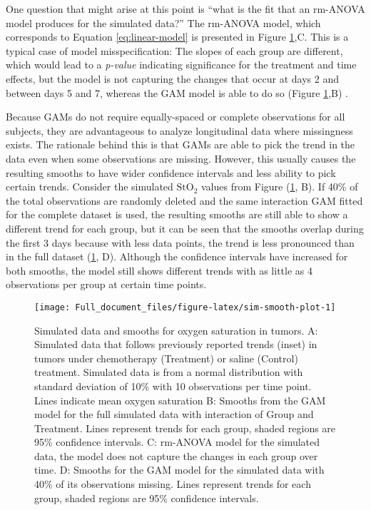 \documentclass[
]{article}
\begin{document}
One question that might arise at this point is ``what is the fit that an rm-ANOVA model produces for the simulated data?'' The rm-ANOVA model, which corresponds to Equation \eqref{eq:linear-model} is presented in Figure \ref{fig:sim-smooth-plot},C. This is a typical case of model misspecification: The slopes of each group are different, which would lead to a \emph{p-value} indicating significance for the treatment and time effects, but the model is not capturing the changes that occur at days 2 and between days 5 and 7, whereas the GAM model is able to do so (Figure \ref{fig:sim-smooth-plot},B) .

Because GAMs do not require equally-spaced or complete observations for all subjects, they are advantageous to analyze longitudinal data where missingness exists. The rationale behind this is that GAMs are able to pick the trend in the data even when some observations are missing. However, this usually causes the resulting smooths to have wider confidence intervals and less ability to pick certain trends. Consider the simulated \(\mbox{StO}_2\) values from Figure (\ref{fig:sim-smooth-plot}, B). If 40\% of the total observations are randomly deleted and the same interaction GAM fitted for the complete dataset is used, the resulting smooths are still able to show a different trend for each group, but it can be seen that the smooths overlap during the first 3 days because with less data points, the trend is less pronounced than in the full dataset (\ref{fig:sim-smooth-plot}, D). Although the confidence intervals have increased for both smooths, the model still shows different trends with as little as 4 observations per group at certain time points.



\begin{figure}[H]

{\centering \texttt{[image: Full\_document\_files/figure-latex/sim-smooth-plot-1]} 

}

\caption{Simulated data and smooths for oxygen saturation in tumors. A: Simulated data that follows previously reported trends (inset) in tumors under chemotherapy (Treatment) or saline (Control) treatment. Simulated data is from a normal distribution with standard deviation of 10\% with 10 observations per time point. Lines indicate mean oxygen saturation B: Smooths from the GAM model for the full simulated data with interaction of Group and Treatment. Lines represent trends for each group, shaded regions are 95\% confidence intervals. C: rm-ANOVA model for the simulated data, the model does not capture the changes in each group over time. D: Smooths for the GAM model for the simulated data with 40\% of its observations missing. Lines represent trends for each group, shaded regions are 95\% confidence intervals.}\label{fig:sim-smooth-plot}
\end{figure}
\end{document}
